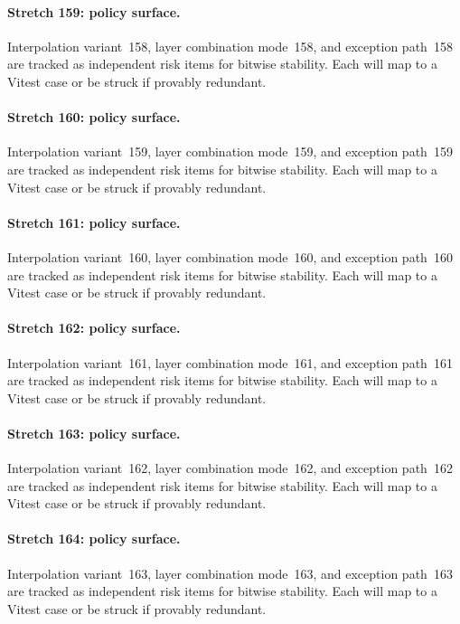 \documentclass[sigconf,nonacm]{acmart}
\begin{document}
\paragraph{Stretch 159: policy surface.}
Interpolation variant~158, layer combination mode~158, and exception path~158 are tracked as independent risk items for bitwise stability. Each will map to a Vitest case or be struck if provably redundant. %

\paragraph{Stretch 160: policy surface.}
Interpolation variant~159, layer combination mode~159, and exception path~159 are tracked as independent risk items for bitwise stability. Each will map to a Vitest case or be struck if provably redundant. %

\paragraph{Stretch 161: policy surface.}
Interpolation variant~160, layer combination mode~160, and exception path~160 are tracked as independent risk items for bitwise stability. Each will map to a Vitest case or be struck if provably redundant. %

\paragraph{Stretch 162: policy surface.}
Interpolation variant~161, layer combination mode~161, and exception path~161 are tracked as independent risk items for bitwise stability. Each will map to a Vitest case or be struck if provably redundant. %

\paragraph{Stretch 163: policy surface.}
Interpolation variant~162, layer combination mode~162, and exception path~162 are tracked as independent risk items for bitwise stability. Each will map to a Vitest case or be struck if provably redundant. %

\paragraph{Stretch 164: policy surface.}
Interpolation variant~163, layer combination mode~163, and exception path~163 are tracked as independent risk items for bitwise stability. Each will map to a Vitest case or be struck if provably redundant. %
\end{document}
